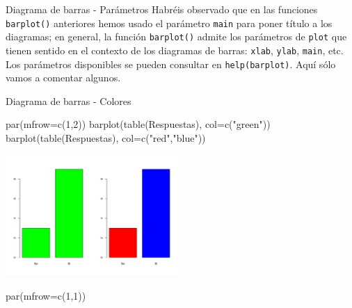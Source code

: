 \documentclass[
  ignorenonframetext,
  aspectratio=169]{beamer}
\newenvironment{Shaded}{\begin{snugshade}}{\end{snugshade}}
\newcommand{\AttributeTok}[1]{\textcolor[rgb]{0.77,0.63,0.00}{#1}}
\newcommand{\DecValTok}[1]{\textcolor[rgb]{0.00,0.00,0.81}{#1}}
\newcommand{\FunctionTok}[1]{\textcolor[rgb]{0.00,0.00,0.00}{#1}}
\newcommand{\NormalTok}[1]{#1}
\newcommand{\StringTok}[1]{\textcolor[rgb]{0.31,0.60,0.02}{#1}}
\begin{document}
\begin{frame}[fragile]{Diagrama de barras - Parámetros}
\protect\hypertarget{diagrama-de-barras---paruxe1metros}{}
Habréis observado que en las funciones \texttt{barplot()} anteriores
hemos usado el parámetro \texttt{main} para poner título a los
diagramas; en general, la función \texttt{barplot()} admite los
parámetros de \texttt{plot} que tienen sentido en el contexto de los
diagramas de barras: \texttt{xlab}, \texttt{ylab}, \texttt{main}, etc.
Los parámetros disponibles se pueden consultar en
\texttt{help(barplot)}. Aquí sólo vamos a comentar algunos.
\end{frame}

\begin{frame}[fragile]{Diagrama de barras - Colores}
\protect\hypertarget{diagrama-de-barras---colores}{}
\begin{Shaded}
\begin{Highlighting}[]
\FunctionTok{par}\NormalTok{(}\AttributeTok{mfrow=}\FunctionTok{c}\NormalTok{(}\DecValTok{1}\NormalTok{,}\DecValTok{2}\NormalTok{))}
\FunctionTok{barplot}\NormalTok{(}\FunctionTok{table}\NormalTok{(Respuestas), }\AttributeTok{col=}\FunctionTok{c}\NormalTok{(}\StringTok{"green"}\NormalTok{))}
\FunctionTok{barplot}\NormalTok{(}\FunctionTok{table}\NormalTok{(Respuestas), }\AttributeTok{col=}\FunctionTok{c}\NormalTok{(}\StringTok{"red"}\NormalTok{,}\StringTok{"blue"}\NormalTok{))}
\end{Highlighting}
\end{Shaded}

\begin{center}\includegraphics[width=250px]{Hora3_files/figure-beamer/unnamed-chunk-34-1} \end{center}

\begin{Shaded}
\begin{Highlighting}[]
\FunctionTok{par}\NormalTok{(}\AttributeTok{mfrow=}\FunctionTok{c}\NormalTok{(}\DecValTok{1}\NormalTok{,}\DecValTok{1}\NormalTok{))}
\end{Highlighting}
\end{Shaded}
\end{frame}
\end{document}
